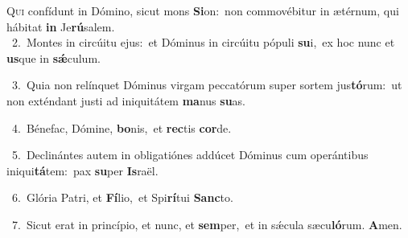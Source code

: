 \lettrine{\initial\textcolor{\initialcolor}{Q}}{ui} confídunt in Dómino, sicut mons \textbf{Si}\-on:~\star non commovébitur in ætérnum, qui hábitat \textbf{in} Je\-\textbf{rú}\-salem.\\
{\numbfont\textcolor{\numbcolor}{~2.}}~Montes in circúitu ejus:~\dagger et Dóminus in circúitu pópuli \textbf{su}\-i,~\star ex hoc nunc et \textbf{us}\-que in \textbf{sǽ}\-culum.\par
{\numbfont\textcolor{\numbcolor}{~3.}}~Quia non relínquet Dóminus virgam peccatórum super sortem jus\-\textbf{tó}\-rum:~\star ut non exténdant justi ad iniquitátem \textbf{ma}\-nus \textbf{su}\-as.\par
{\numbfont\textcolor{\numbcolor}{~4.}}~Bénefac, Dómine, \textbf{bo}\-nis,~\star et \textbf{rec}\-tis \textbf{cor}\-de.\par
{\numbfont\textcolor{\numbcolor}{~5.}}~Declinántes autem in obligatiónes addúcet Dóminus cum operántibus iniqui\-\textbf{tá}\-tem:~\star pax \textbf{su}\-per \textbf{Is}\-raël.\par
{\numbfont\textcolor{\numbcolor}{~6.}}~Glória Patri, et \textbf{Fí}\-lio,~\star et Spi\-\textbf{rí}\-tui \textbf{Sanc}\-to.\par
{\numbfont\textcolor{\numbcolor}{~7.}}~Sicut erat in princípio, et nunc, et \textbf{sem}\-per,~\star et in sǽcula sæcu\-\textbf{ló}\-rum. \textbf{A}\-men.\par
